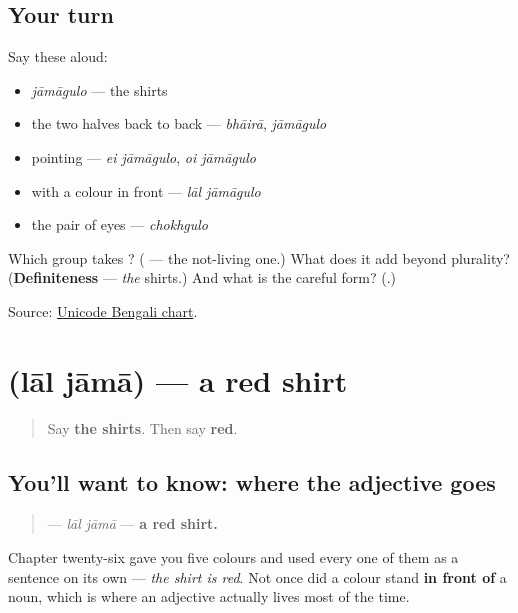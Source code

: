 \subsection*{Your turn}
Say these aloud:

\begin{itemize}
\raggedright
  \item \emph{jāmāgulo} — the shirts
  \item the two halves back to back — \emph{bhāirā}, \emph{jāmāgulo}
  \item pointing — \emph{ei jāmāgulo}, \emph{oi jāmāgulo}
  \item with a colour in front — \emph{lāl jāmāgulo}
  \item the pair of eyes — \emph{chokhgulo}
\end{itemize}

\begin{tcolorbox}[breakable,colback=teal!4,colframe=teal!35!black,title={Before you move on}]
Which group takes \textbf{}? (\textbf{} — the not-living one.) What does it add beyond plurality? (\textbf{Definiteness} — \emph{the} shirts.) And what is the careful form? (\textbf{}.)

Source: \href{https://www.unicode.org/charts/PDF/U0980.pdf}{Unicode Bengali chart}.
\end{tcolorbox}
\section[\texorpdfstring{\bn{লাল} \bn{জামা} (lāl jāmā)}{লাল জামা (lāl jāmā)}]{  (lāl jāmā) — a red shirt}

\label{lesson:BN-C22-adj-order}



\begin{quote}
Say \textbf{the shirts}. Then say \textbf{red}.
\end{quote}

\subsection*{You'll want to know: where the adjective goes}
\begin{quote}
\textbf{ } — \emph{lāl jāmā} — \textbf{a red shirt.}
\end{quote}

Chapter twenty-six gave you five colours and used every one of them as a sentence on its own — \emph{the shirt is red}. Not once did a colour stand \textbf{in front of} a noun, which is where an adjective actually lives most of the time.

